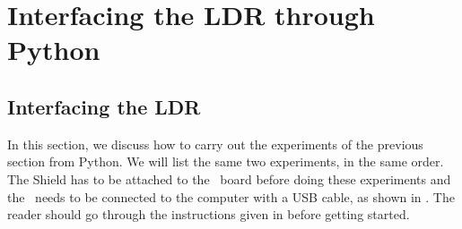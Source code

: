 \section{Interfacing the LDR through Python}
\subsection{Interfacing the LDR}
In this section, we discuss how to carry out the experiments of the
previous section from Python.  We will list the same two experiments,
in the same order.  The Shield has to be attached to the \arduino\ board
before doing these experiments and the \arduino\ needs to be connected to the computer 
with a USB cable, as shown in .
The reader should go through the instructions given in
 before getting started.

